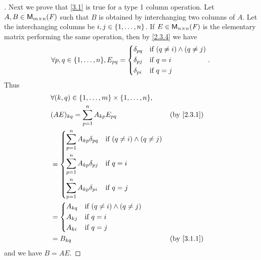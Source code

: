 \begin{proof}[]
	Next we prove that \cref{3.1} is true for a type 1 column operation.
	Let \(A, B \in \ms\) such that \(B\) is obtained by interchanging two columns of \(A\).
	Let the interchanging columns be \(i, j \in \left\lbrace1, \dots, n\right\rbrace\).
	If \(E \in \ms[n][n][\F]\) is the elementary matrix performing the same operation, then by \cref{2.3.4} we have
	\[
		\forall p, q \in \set{1, \dots, n}, E_{p q} = \begin{dcases}
			\delta_{p q} & \text{if } (q \neq i) \land (q \neq j) \\
			\delta_{p j} & \text{if } q = i                       \\
			\delta_{p i} & \text{if } q = j
		\end{dcases}.
	\]
	Thus
	\begin{align*}
		 & \forall (k, q) \in \set{1, \dots, m} \times \set{1, \dots, n},                                  \\
		 & (AE)_{k q} = \sum_{p = 1}^n A_{k p} E_{p q}                                     &  & \by{2.3.1} \\
		 & = \begin{dcases}
			     \sum_{p = 1}^n A_{k p} \delta_{p q} & \text{if } (q \neq i) \land (q \neq j) \\
			     \sum_{p = 1}^n A_{k p} \delta_{p j} & \text{if } q = i                       \\
			     \sum_{p = 1}^n A_{k p} \delta_{p i} & \text{if } q = j
		     \end{dcases}                  \\
		 & = \begin{dcases}
			     A_{k q} & \text{if } (q \neq i) \land (q \neq j) \\
			     A_{k j} & \text{if } q = i                       \\
			     A_{k i} & \text{if } q = j
		     \end{dcases}                                              \\
		 & = B_{k q}                                                                       &  & \by{3.1.1}
	\end{align*}
	and we have \(B = AE\).


\end{proof}
